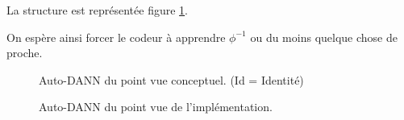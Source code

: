 La structure est représentée figure \ref{fig:AutoDANN}.

On espère ainsi forcer le codeur à apprendre $\phi^{-1}$ ou du moins quelque chose
de proche.

\begin{figure}[htbp]
\centering
{}
\caption{Auto-DANN du point vue conceptuel. (Id = Identité)}
\label{fig:AutoDANNC}

\hfill
{}
\caption{Auto-DANN du point vue de l'implémentation.}
\label{fig:AutoDANN}
\end{figure}

